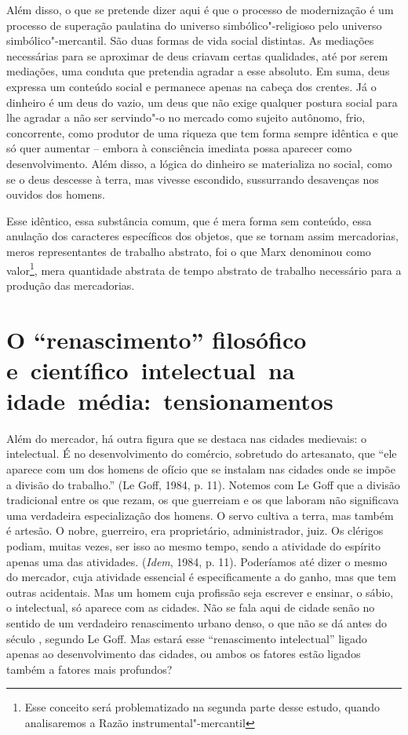 Além disso, o que se pretende dizer aqui é que o processo de
modernização é um processo de superação paulatina do universo
simbólico"-religioso pelo universo simbólico"-mercantil. São duas formas
de vida social distintas. As mediações necessárias para se aproximar de
deus criavam certas qualidades, até por serem mediações, uma conduta que
pretendia agradar a esse absoluto. Em suma, deus expressa um conteúdo
social e permanece apenas na cabeça dos crentes. Já o dinheiro é um deus
do vazio, um deus que não exige qualquer postura social para lhe agradar
a não ser servindo"-o no mercado como sujeito autônomo, frio,
concorrente, como produtor de uma riqueza que tem forma sempre idêntica
e que só quer aumentar -- embora à consciência imediata possa aparecer
como desenvolvimento. Além disso, a lógica do dinheiro se materializa no
social, como se o deus descesse à terra, mas vivesse escondido,
sussurrando desavenças nos ouvidos dos homens.

Esse idêntico, essa substância comum, que é mera forma sem conteúdo,
essa anulação dos caracteres específicos dos objetos, que se tornam
assim mercadorias, meros representantes de trabalho abstrato, foi o que
Marx denominou como valor\footnote{Esse conceito será problematizado na
  segunda parte desse estudo, quando analisaremos a Razão
  instrumental"-mercantil}, mera quantidade abstrata de tempo abstrato de
trabalho necessário para a produção das mercadorias.

\section*{O ``renascimento'' filosófico e~científico~intelectual~na idade~média:~tensionamentos}

Além do mercador, há outra figura que se destaca nas cidades medievais:
o intelectual. É no desenvolvimento do comércio, sobretudo do
artesanato, que ``ele aparece com um dos homens de ofício que se
instalam nas cidades onde se impõe a divisão do trabalho.'' (Le Goff,
1984, p. 11). Notemos com Le Goff que a divisão tradicional entre os que
rezam, os que guerreiam e os que laboram não significava uma verdadeira
especialização dos homens. O servo cultiva a terra, mas também é
artesão. O nobre, guerreiro, era proprietário, administrador, juiz. Os
clérigos podiam, muitas vezes, ser isso ao mesmo tempo, sendo a
atividade do espírito apenas uma das atividades. (\emph{Idem}, 1984, p.
11). Poderíamos até dizer o mesmo do mercador, cuja atividade essencial
é especificamente a do ganho, mas que tem outras acidentais. Mas um
homem cuja profissão seja escrever e ensinar, o sábio, o intelectual, só
aparece com as cidades. Não se fala aqui de cidade senão no sentido de
um verdadeiro renascimento urbano denso, o que não se dá antes do século
, segundo Le Goff. Mas estará esse ``renascimento intelectual''
ligado apenas ao desenvolvimento das cidades, ou ambos os fatores estão
ligados também a fatores mais profundos?


